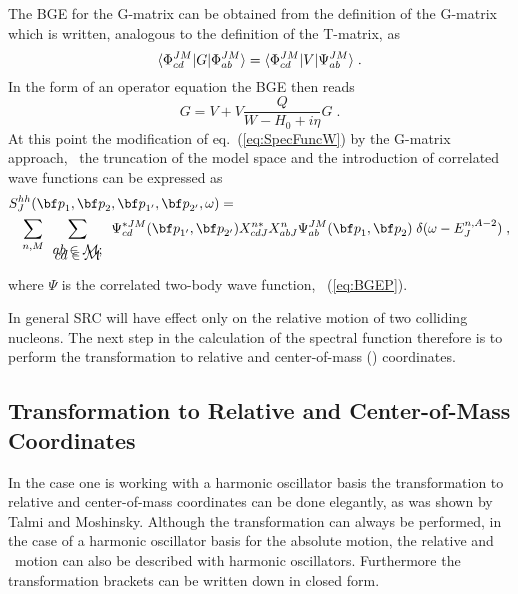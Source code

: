 The BGE for the G-matrix can be obtained from the definition of the G-matrix
which is written, analogous to the definition of the T-matrix, as
%
	\begin{equation}
		\ME<\Phi^{JM}_{cd}| G |\Phi^{JM}_{ab}>
	=
		\ME<\Phi^{JM}_{cd}| V |\Psi^{JM}_{ab}>
	\;.
	\end{equation}
%
In the form of an operator equation the BGE then reads
%
	\begin{equation}
		G
	=
		V + V \frac{Q}{W - H_0 +i\eta}G
	\label{eq:BGG}
	\;.
	\end{equation}
%
At this point the modification of eq.~(\ref{eq:SpecFuncW}) by the G-matrix 
approach, \ie\ the truncation of the model space and the introduction of
correlated wave functions can be expressed as
%
	\begin{eqnarray}
	\lefteqn{%
		S^{hh}_J( \rvec{p}_1, \rvec{p}_2, 
		          \rvec{p}_{1'}, \rvec{p}_{2'}, \omega )
	=
	} && 
	\label{eq:SpecFuncC}\\
	&&
		\sum_{n,M}
		\sum_{\begin{array}{c}
			ab \in \calM;\\[-8pt]
			cd \in \calM
		      \end{array}}
		\Psi^{\ast JM}_{cd}( \rvec{p}_{1'}, \rvec{p}_{2'} )
		X^{n\ast}_{cd J} X^{n}_{ab J} 
		\Psi^{JM}_{ab}( \rvec{p}_1, \rvec{p}_2 )
		\;
		\delta(\omega - E^{n,A-2}_{J} )
	\nonumber
	\;,
	\end{eqnarray}
%
where $\Psi$ is the correlated two-body wave function, \cf~(\ref{eq:BGEP}).

In general SRC will have effect only on the relative motion of two colliding
nucleons. 
The next step in the calculation of the spectral function therefore is to 
perform the 
transformation to relative and center-of-mass (\CM) coordinates. 

\subsection{Transformation to Relative and Center-of-Mass 
Coordinates\label{sec:Mos}}
In the case one is working with a harmonic oscillator basis the 
transformation to relative and center-of-mass coordinates can be done 
elegantly, as was shown by Talmi\cite{Ta52} and Moshinsky\cite{MB60}.
Although the transformation can always be performed, in the case of a
harmonic oscillator basis for the absolute motion, the relative and \CM\ 
motion can also be described with harmonic oscillators. Furthermore the 
transformation brackets can be written down in closed form.

